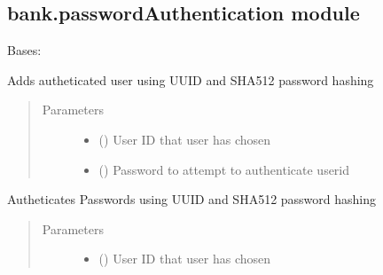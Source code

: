 \documentclass[letterpaper,10pt,english]{sphinxmanual}
\begin{document}
\subsection{bank.passwordAuthentication module}
\label{\detokenize{bank:module-bank.passwordAuthentication}}\label{\detokenize{bank:bank-passwordauthentication-module}}

\begin{fulllineitems}
\label{\detokenize{bank:bank.passwordAuthentication.Password}}
Bases: 

\begin{fulllineitems}
\label{\detokenize{bank:bank.passwordAuthentication.Password.addAutheticatedUser}}
Adds autheticated user using UUID and SHA512 password hashing
\begin{quote}\begin{description}
\item[{Parameters}] \leavevmode\begin{itemize}
\item {} 
 () \textendash{} User ID that user has chosen

\item {} 
 () \textendash{} Password to attempt to authenticate userid

\end{itemize}

\end{description}\end{quote}

\end{fulllineitems}


\begin{fulllineitems}
\label{\detokenize{bank:bank.passwordAuthentication.Password.authenticate_password}}
Autheticates Passwords using UUID and SHA512 password hashing
\begin{quote}\begin{description}
\item[{Parameters}] \leavevmode\begin{itemize}
\item {} 
 () \textendash{} User ID that user has chosen


\end{itemize}
\end{description}
\end{quote}
\end{fulllineitems}
\end{fulllineitems}
\end{document}
